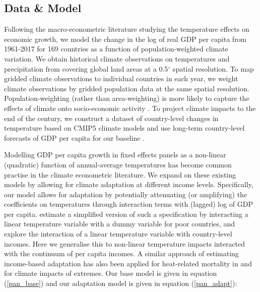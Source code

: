 \documentclass[11pt, letterpaper]{article}
\numberwithin{algorithm}{section}
\numberwithin{assumption}{section}
\numberwithin{lemma}{section}
\numberwithin{theorem}{section}
\numberwithin{corollary}{section}
\numberwithin{remark}{section}
\numberwithin{equation}{section}
\numberwithin{figure}{section}
\numberwithin{table}{section}
\newcommand{\ignore}[1]{}
\begin{document}
\subsection{Data \& Model}
Following the macro-econometric literature studying the temperature effects on economic growth, we model the change in the log of real GDP per capita \cite[World Development Indicators, ][]{rld2019world} from 1961-2017 for 169 countries as a function of population-weighted climate variation. We obtain historical climate observations on temperatures and precipitation from \citep[][ version 5]{matsuura2018terrestrial} covering global land areas at a 0.5$^\circ$ spatial resolution. To map gridded climate observations to individual countries in each year, we weight climate observations by gridded population data \citep{ciesin2016gridded} at the same spatial resolution. Population-weighting (rather than area-weighting) is more likely to capture the effects of climate onto socio-economic activity \citep[see ][]{tol2017population}. To project climate impacts to the end of the century, we construct a dataset of country-level changes in temperature \ignore{and precipitation} based on CMIP5 climate models \citep{taylor2012overview} and use long-term country-level forecasts of GDP per capita for our baseline \citep{muller2019econometric}.

Modelling GDP per capita growth in fixed effects panels as a non-linear (quadratic) function of annual-average temperatures has become common practise in the climate econometric literature. We expand on these existing models by allowing for climate adaptation at different income levels. Specifically, our model allows for adaptation by potentially attenuating (or amplifying) the coefficients on temperatures through interaction terms with (lagged) log of GDP per capita. \citet{dell2012temperature} estimate a simplified version of such a specification by interacting a linear temperature variable with a dummy variable for poor countries, and \citet{burke2015global} explore the interaction of a linear temperature variable with country-level incomes. Here we generalise this to non-linear temperature impacts interacted with the continuum of per capita incomes. A similar approach of estimating income-based adaptation has also been applied for heat-related mortality in \citet{carleton2020valuing} and \citet{schwarz2020modelling} for climate impacts of extremes. Our base model is given in equation (\ref{pan_base}) and our adaptation model is given in equation (\ref{pan_adapt}):
\end{document}
